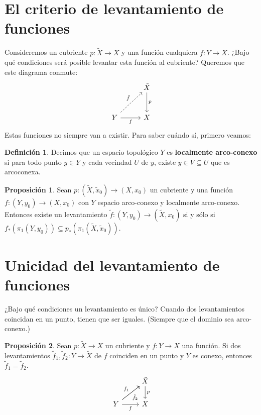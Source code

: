 \documentclass[spanish]{book}
\theoremstyle{definition}
\newtheorem*{defn}{Definición}
\newtheorem*{prop}{Proposición}
\begin{document}
\section{El criterio de levantamiento de funciones}
Consideremos un cubriente $p:\tilde{X}\to X$ y una función cualquiera $f:Y\to X$. ¿Bajo qué condiciones será posible levantar esta función al cubriente? Queremos que este diagrama conmute:
\[\begin{tikzcd}[column sep=1cm,row sep=1cm]
	&\tilde{X}\arrow[d,"p"]\\
	Y\arrow[ur,dashed,"\tilde{f}"]\arrow[r,swap,"f"]&X
\end{tikzcd}\]
Estas funciones no siempre van a existir. Para saber cuándo sí, primero veamos:
\begin{defn}
	Decimos que un espacio topológico $Y$ es \textbf{localmente arco-conexo} si para todo punto $y\in Y$ y cada vecindad $U$ de $y$, existe $y\in V\subseteq U$ que es arcoconexa.
\end{defn}
\begin{prop}
	Sean $p:(\tilde{X},\tilde{x}_0)\to (X,x_0)$ un cubriente y una función $f:(Y,y_0)\to (X,x_0)$ con $Y$ espacio arco-conexo y localmente arco-conexo. Entonces existe un levantamiento $\tilde{f}:(Y,y_0)\to(\tilde{X},x_0)$ si y sólo si $f_*\left(\pi_1(Y,y_0)\right)\subseteq p_*\left(\pi_1(\tilde{X},\tilde{x}_0)\right)$.
\end{prop}
\section{Unicidad del levantamiento de funciones}
	¿Bajo qué condiciones un levantamiento es único? Cuando dos levantamientos coincidan en un punto, tienen que ser iguales. (Siempre que el dominio sea arco-conexo.)
	
	\begin{prop}
		Sean $p:\tilde{X}\to X$ un cubriente y $f:Y\to X$ una función. Si dos levantamientos $\tilde{f}_1,\tilde{f}_2:Y\to\tilde{X}$ de $f$ coinciden en un punto y $Y$ es conexo, entonces $\tilde{f}_1=\tilde{f}_2$.
		\[\begin{tikzcd}
				&\tilde{X}\arrow[d,"p"]\\
				Y\arrow[ru,"\tilde{f}_1"]\arrow[ru,swap,"\tilde{f}_2"]\arrow[r,swap,"f"]&X
			\end{tikzcd}\]
	\end{prop}



\end{document}
